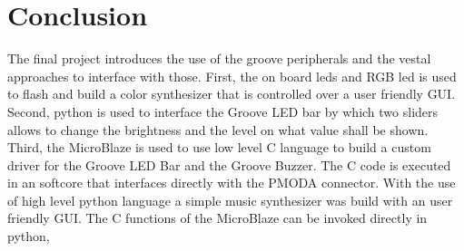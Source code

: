 \section{Conclusion}\label{sec: Conclusion}
The final project introduces the use of the groove peripherals and the vestal approaches to interface with those. First, the on board leds and RGB led is used to flash and build a color synthesizer that is controlled over a user friendly GUI. Second, python is used to interface the Groove LED bar by which two sliders allows to change the brightness and the level on what value shall be shown. Third, the MicroBlaze is used to use low level C language to build a custom driver for the Groove LED Bar and the Groove Buzzer. The C code is executed in an softcore that interfaces directly with the PMODA connector. With the use of high level python language a simple music synthesizer was build with an user friendly GUI. The C functions of the MicroBlaze can be invoked directly in python,

%
